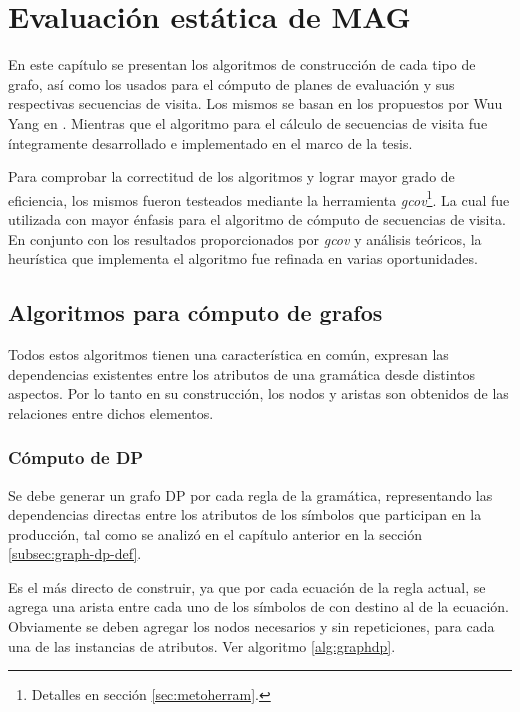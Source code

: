 \chapter{Evaluación estática de MAG}
\label{chap:eval_est}
\minitoc

En este capítulo se presentan los algoritmos de construcción de cada tipo de grafo, así como los usados para el cómputo de planes de evaluación y sus respectivas secuencias de visita. Los mismos se basan en los propuestos por Wuu Yang en \cite{wuu-yang1}. Mientras que el algoritmo para el cálculo de secuencias de visita fue íntegramente desarrollado e implementado en el marco de la tesis.

Para comprobar la correctitud de los algoritmos y lograr mayor grado de eficiencia, los mismos fueron testeados mediante la herramienta \textit{gcov}\footnote{Detalles en sección \ref{sec:metoherram}.}. La cual fue utilizada con mayor énfasis para el algoritmo de cómputo de secuencias de visita. En conjunto con los resultados proporcionados por \textit{gcov} y análisis teóricos, la heurística que implementa el algoritmo fue refinada en varias oportunidades.

\section{Algoritmos para cómputo de grafos}

Todos estos algoritmos tienen una característica en común, expresan las dependencias existentes entre los atributos de una gramática desde distintos aspectos. Por lo tanto en su construcción, los nodos y aristas son obtenidos de las relaciones entre dichos elementos.

\subsection{Cómputo de DP}
\label{subsec:alg-DP}
Se debe generar un grafo DP por cada regla de la gramática, representando las dependencias directas entre los atributos de los símbolos que participan en la producción, tal como se analizó en el capítulo anterior en la sección \ref{subsec:graph-dp-def}.

Es el más directo de construir, ya que por cada ecuación de la regla actual, se agrega una arista entre cada uno de los símbolos de  con destino al  de la ecuación. Obviamente se deben agregar los nodos necesarios y sin repeticiones, para cada una de las instancias de atributos. Ver algoritmo \ref{alg:graphdp}.

